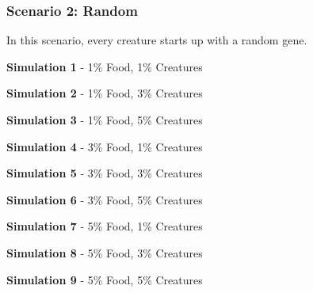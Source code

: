 \documentclass{article}
\begin{document}
\subsubsection{Scenario 2: Random}

In this scenario, every creature starts up with a random gene.

\textbf{Simulation 1} - 1\% Food, 1\% Creatures

\textbf{Simulation 2} - 1\% Food, 3\% Creatures

\textbf{Simulation 3} - 1\% Food, 5\% Creatures

\textbf{Simulation 4} - 3\% Food, 1\% Creatures

\textbf{Simulation 5} - 3\% Food, 3\% Creatures

\textbf{Simulation 6} - 3\% Food, 5\% Creatures

\textbf{Simulation 7} - 5\% Food, 1\% Creatures

\textbf{Simulation 8} - 5\% Food, 3\% Creatures

\textbf{Simulation 9} - 5\% Food, 5\% Creatures
\end{document}
